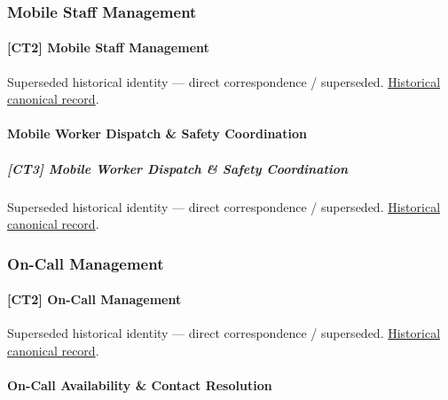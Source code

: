 \subsubsection{Mobile Staff Management}

\paragraph{[CT2] Mobile Staff Management}

\par\label{element:32118856636f400a95fc28daacea61c8}
Superseded historical identity — direct correspondence / superseded. \href{../../../../continuum/strategy/capability/32118856636f400a95fc28daacea61c8.md}{Historical canonical record}.\par

\paragraph{Mobile Worker Dispatch \& Safety Coordination}

\subparagraph{[CT3] Mobile Worker Dispatch \& Safety Coordination}

\par\label{element:5aafd1f4bff046b2b532c20dfb191473}
Superseded historical identity — direct correspondence / superseded. \href{../../../../continuum/strategy/capability/5aafd1f4bff046b2b532c20dfb191473.md}{Historical canonical record}.\par

\subsubsection{On-Call Management}

\paragraph{[CT2] On-Call Management}

\par\label{element:c8e6e66e8718493c9093f37d129f9ff2}
Superseded historical identity — direct correspondence / superseded. \href{../../../../continuum/strategy/capability/c8e6e66e8718493c9093f37d129f9ff2.md}{Historical canonical record}.\par

\paragraph{On-Call Availability \& Contact Resolution}

